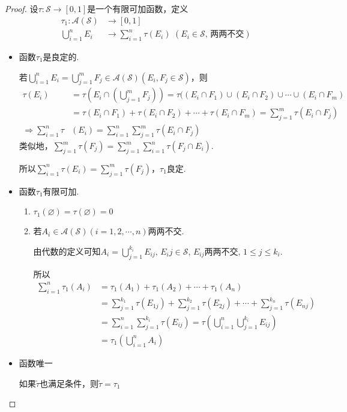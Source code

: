 \begin{proof}
    设$\tau:\mathcal{S}\to[0,1]$是一个有限可加函数，定义
    {\setlength{\jot}{-5pt}\begin{align*}
        \tau_1:\mathcal{A}(\mathcal{S})&\to[0,1]\\
        \bigcup_{i=1}^n{E_i}&\to\sum_{i=1}^n{\tau(E_i)}\,\,(E_i\in\mathcal{S},\,\text{两两不交})
    \end{align*}}
    \begin{itemize}
        \item 函数$\tau_1$是良定的.\par
        若$\bigcup_{i=1}^n{E_i}=\bigcup_{j=1}^m{F_j}\in\mathcal{A}(\mathcal{S})(E_i,F_j\in\mathcal{S})$，则
        {\setjot[-5]\begin{align*}
            \tau(E_i)&=\tau\left(E_i\cap\left(\bigcup_{j=1}^m{F_j}\right)\right)=\tau((E_i\cap F_1)\cup(E_i\cap F_2) \cup \cdots\cup(E_i\cap F_m) \\
            &=\tau(E_i\cap F_1)+\tau(E_i\cap F_2)+\cdots+\tau(E_i\cap F_m)=\sum_{j=1}^m\tau(E_i\cap F_j) \\
            \Rightarrow\sum_{i=1}^n\tau&(E_i)=\sum_{i=1}^n\sum_{j=1}^m{\tau(E_i\cap F_j)}
        \end{align*}}
        类似地，$\sum_{j=1}^m{\tau(F_j)}=\sum_{j=1}^m\sum_{i=1}^n{\tau(F_j\cap E_i)}$.\par
        所以$\sum_{i=1}^n{\tau(E_i)}=\sum_{j=1}^m{\tau(F_j)}$，$\tau_1$良定.
        \item 函数$\tau_1$有限可加.\par
        \begin{enumerate}[(1)]
            \item $\tau_1(\varnothing)=\tau(\varnothing)=0$
            \item 若$A_i\in\mathcal{A}(\mathcal{S})(i=1,2,\cdots,n)$两两不交.\par
            由代数的定义可知$A_i=\bigcup_{j=1}^{k_i}{E_{ij}},\,E_ij\in\mathcal{S},\,E_{ij}\text{两两不交},\, 1\leqslant j\leqslant k_i$.\par
            所以
            \vspace{-1em}
            {\setjot[-5]\begin{align*}
                \sum_{i=1}^n{\tau_1(A_i)}&=\tau_1(A_1)+\tau_1(A_2)+\cdots+\tau_1(A_n)\\
                &=\sum_{j=1}^{k_1}{\tau(E_{1j})}+\sum_{j=1}^{k_2}{\tau(E_{2j})}+\cdots+\sum_{j=1}^{k_n}{\tau(E_{nj})}\\
                &=\sum_{i=1}^n\sum_{j=1}^{k_i}{\tau(E_{ij})}=\tau\left(\bigcup_{i=1}^n\bigcup_{j=1}^{k_i}{E_{ij}}\right)\\
                &=\tau_1\left(\bigcup_{i=1}^n{A_i}\right)
            \end{align*}}
        \end{enumerate}
        \item 函数唯一\par
        如果$\tilde{\tau}$也满足条件，则$\tilde{\tau}=\tau_1$
    \end{itemize}
\end{proof}
